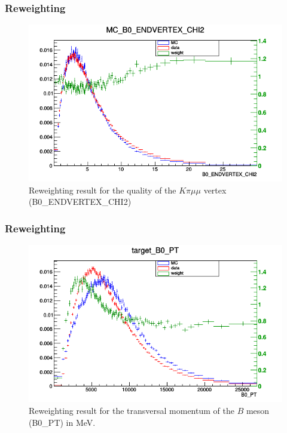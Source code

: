 \documentclass{beamer}
\begin{document}
\begin{frame}
  \frametitle{Reweighting}

  \begin{figure}
   \includegraphics[width=0.8\linewidth]{figures/B0_ENDVERTEX_CHI2w}
   \caption{Reweighting result for the quality of the $K \pi \mu \mu$ vertex (B0\_ENDVERTEX\_CHI2)}
  \end{figure}


\end{frame}


\begin{frame}
  \frametitle{Reweighting}

  \begin{figure}
   \includegraphics[width=0.8\linewidth]{figures/B0_PTw}
   \caption{Reweighting result for the transversal momentum of the $B$ meson (B0\_PT) in MeV.}
  \end{figure}


\end{frame}

\end{document}
